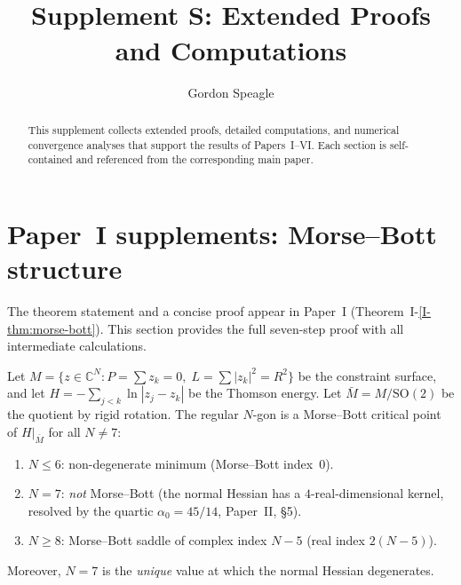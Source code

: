 








\title{\seriestitle\\[6pt]\large Supplement S: Extended Proofs and Computations}
\author{Gordon Speagle}
\date{}


\maketitle

\begin{abstract}
This supplement collects extended proofs, detailed computations,
and numerical convergence analyses that support the results of
Papers~I--VI.
Each section is self-contained and referenced from the
corresponding main paper.
\end{abstract}

\section{Paper~I supplements: Morse--Bott structure}
\label{sec:morse-bott}

The theorem statement and a concise proof appear in
Paper~I (Theorem~I-\ref*{I-thm:morse-bott}).
This section provides the full seven-step proof with
all intermediate calculations.

\begin{theorem}
\label{thm:morse-bott}
Let $M = \{z \in \mathbb{C}^N : P = \sum z_k = 0,\;
L = \sum|z_k|^2 = R^2\}$ be the constraint surface,
and let $H = -\sum_{j<k}\ln|z_j - z_k|$ be the Thomson
energy.  Let $\bar{M} = M/\mathrm{SO}(2)$ be the quotient
by rigid rotation.
The regular $N$-gon is a Morse--Bott critical point of
$H|_{\bar{M}}$ for all $N \ne 7$:
\begin{enumerate}
\item $N \le 6$: non-degenerate minimum (Morse--Bott index~$0$).
\item $N = 7$: \emph{not} Morse--Bott
  (the normal Hessian has a $4$-real-dimensional kernel,
  resolved by the quartic $\alpha_0 = 45/14$, Paper~II, \S5).
\item $N \ge 8$: Morse--Bott saddle of complex index $N{-}5$
  (real index $2(N{-}5)$).
\end{enumerate}
Moreover, $N = 7$ is the \emph{unique} value at which the
normal Hessian degenerates.
\end{theorem}

